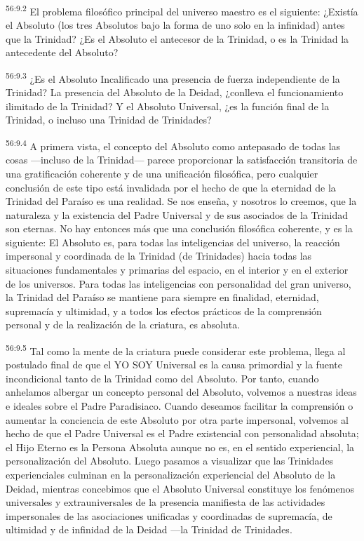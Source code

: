 \par
\textsuperscript{56:9.2} El problema filosófico principal del universo maestro es el siguiente: ¿Existía el Absoluto (los tres Absolutos bajo la forma de uno solo en la infinidad) antes que la Trinidad? ¿Es el Absoluto el antecesor de la Trinidad, o es la Trinidad la antecedente del Absoluto?

\par
\textsuperscript{56:9.3} ¿Es el Absoluto Incalificado una presencia de fuerza independiente de la Trinidad? La presencia del Absoluto de la Deidad, ¿conlleva el funcionamiento ilimitado de la Trinidad? Y el Absoluto Universal, ¿es la función final de la Trinidad, o incluso una Trinidad de Trinidades?

\par
\textsuperscript{56:9.4} A primera vista, el concepto del Absoluto como antepasado de todas las cosas ---incluso de la Trinidad--- parece proporcionar la satisfacción transitoria de una gratificación coherente y de una unificación filosófica, pero cualquier conclusión de este tipo está invalidada por el hecho de que la eternidad de la Trinidad del Paraíso es una realidad. Se nos enseña, y nosotros lo creemos, que la naturaleza y la existencia del Padre Universal y de sus asociados de la Trinidad son eternas. No hay entonces más que una conclusión filosófica coherente, y es la siguiente: El Absoluto es, para todas las inteligencias del universo, la reacción impersonal y coordinada de la Trinidad (de Trinidades) hacia todas las situaciones fundamentales y primarias del espacio, en el interior y en el exterior de los universos. Para todas las inteligencias con personalidad del gran universo, la Trinidad del Paraíso se mantiene para siempre en finalidad, eternidad, supremacía y ultimidad, y a todos los efectos prácticos de la comprensión personal y de la realización de la criatura, es absoluta.

\par
\textsuperscript{56:9.5} Tal como la mente de la criatura puede considerar este problema, llega al postulado final de que el YO SOY Universal es la causa primordial y la fuente incondicional tanto de la Trinidad como del Absoluto. Por tanto, cuando anhelamos albergar un concepto personal del Absoluto, volvemos a nuestras ideas e ideales sobre el Padre Paradisiaco. Cuando deseamos facilitar la comprensión o aumentar la conciencia de este Absoluto por otra parte impersonal, volvemos al hecho de que el Padre Universal es el Padre existencial con personalidad absoluta; el Hijo Eterno es la Persona Absoluta aunque no es, en el sentido experiencial, la personalización del Absoluto. Luego pasamos a visualizar que las Trinidades experienciales culminan en la personalización experiencial del Absoluto de la Deidad, mientras concebimos que el Absoluto Universal constituye los fenómenos universales y extrauniversales de la presencia manifiesta de las actividades impersonales de las asociaciones unificadas y coordinadas de supremacía, de ultimidad y de infinidad de la Deidad ---la Trinidad de Trinidades.

